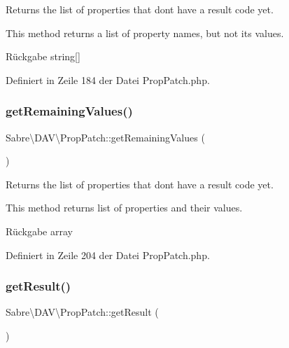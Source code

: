 Returns the list of properties that don\textquotesingle{}t have a result code yet.

This method returns a list of property names, but not its values.

\begin{DoxyReturn}{Rückgabe}
string\mbox{[}\mbox{]} 
\end{DoxyReturn}


Definiert in Zeile 184 der Datei Prop\+Patch.\+php.

\mbox{\label{class_sabre_1_1_d_a_v_1_1_prop_patch_a4ef0dca1d6eafc8bf30fa1ede367cecb}} 
\subsubsection{\texorpdfstring{get\+Remaining\+Values()}{getRemainingValues()}}
{\footnotesize\ttfamily Sabre\textbackslash{}\+D\+A\+V\textbackslash{}\+Prop\+Patch\+::get\+Remaining\+Values (\begin{DoxyParamCaption}{ }\end{DoxyParamCaption})}

Returns the list of properties that don\textquotesingle{}t have a result code yet.

This method returns list of properties and their values.

\begin{DoxyReturn}{Rückgabe}
array 
\end{DoxyReturn}


Definiert in Zeile 204 der Datei Prop\+Patch.\+php.

\mbox{\label{class_sabre_1_1_d_a_v_1_1_prop_patch_afbe27359bdd164d4a3ebcb66fb61fd73}} 
\subsubsection{\texorpdfstring{get\+Result()}{getResult()}}
{\footnotesize\ttfamily Sabre\textbackslash{}\+D\+A\+V\textbackslash{}\+Prop\+Patch\+::get\+Result (\begin{DoxyParamCaption}{ }\end{DoxyParamCaption})}

